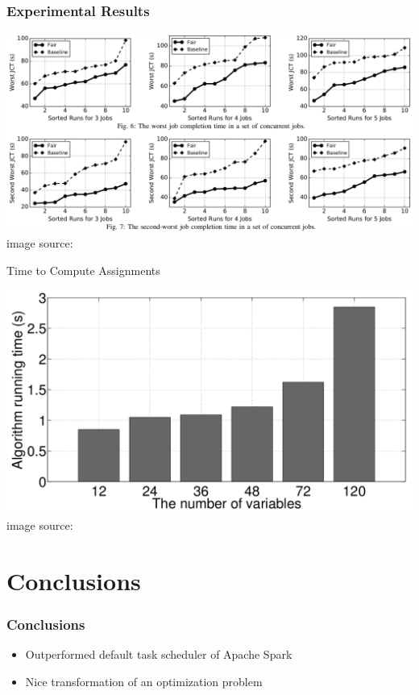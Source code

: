 \documentclass[presentation,professionalfonts]{beamer}
\begin{document}
\begin{frame}
  \frametitle{Experimental Results}
  \begin{center}
  \includegraphics[width=1.03\textwidth]{main_result}\\
  image source: \textcite{Chen2017}
  \end{center}
\end{frame}

\begin{frame}{Time to Compute Assignments}
  \begin{center}
  \includegraphics[width=1\textwidth]{algo_time}\\
  image source: \textcite{Chen2017}
  \end{center}
\end{frame}


\section{Conclusions}

\begin{frame}
  \frametitle{Conclusions}
  \begin{itemize}
  \item Outperformed default task scheduler of Apache Spark
  \item Nice transformation of an optimization problem
  \end{itemize}
\end{frame}
\end{document}
